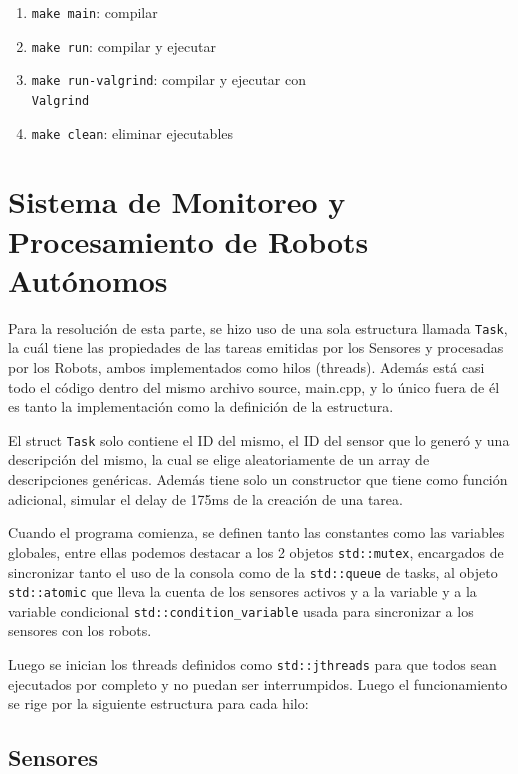 \documentclass[11pt, a4paper]{article}
\begin{document}
\begin{multicols}{2}
\begin{enumerate}[label=\roman*.]
    \item \texttt{make main}: compilar
    \item \texttt{make run}: compilar y ejecutar
    \item \texttt{make run-valgrind}: compilar y ejecutar con \\ \texttt{Valgrind}
    \item \texttt{make clean}: eliminar ejecutables
\end{enumerate}

\section{Sistema de Monitoreo y Procesamiento de Robots Autónomos}

Para la resolución de esta parte, se hizo uso de una sola estructura llamada \texttt{Task}, la cuál tiene las propiedades de las tareas emitidas por los Sensores y procesadas por los Robots, ambos implementados como hilos (threads). Además está casi todo el código dentro del mismo archivo source, main.cpp, y lo único fuera de él es tanto la implementación como la definición de la estructura.

El struct \texttt{Task} solo contiene el ID del mismo, el ID del sensor que lo generó y una descripción del mismo, la cual se elige aleatoriamente de un array de descripciones genéricas. Además tiene solo un constructor que tiene como función adicional, simular el delay de 175ms de la creación de una tarea.

Cuando el programa comienza, se definen tanto las constantes como las variables globales, entre ellas podemos destacar a los 2 objetos \texttt{std::mutex}, encargados de sincronizar tanto el uso de la consola como de la \texttt{std::queue} de tasks, al objeto \texttt{std::atomic} que lleva la cuenta de los sensores activos y a la variable y a la variable condicional \texttt{std::condition\_variable} usada para sincronizar a los sensores con los robots.

Luego se inician los threads definidos como \texttt{std::jthreads} para que todos sean ejecutados por completo y no puedan ser interrumpidos. Luego el funcionamiento se rige por la siguiente estructura para cada hilo:

\subsection{Sensores}


\end{multicols}
\end{document}
